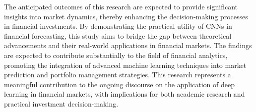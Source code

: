 \thesisspacing %

The anticipated outcomes of this research are expected to provide significant insights into market dynamics, thereby enhancing the decision-making processes in financial investments. By demonstrating the practical utility of CNNs in financial forecasting, this study aims to bridge the gap between theoretical advancements and their real-world applications in financial markets. The findings are expected to contribute substantially to the field of financial analytics, promoting the integration of advanced machine learning techniques into market prediction and portfolio management strategies. This research represents a meaningful contribution to the ongoing discourse on the application of deep learning in financial markets, with implications for both academic research and practical investment decision-making.
